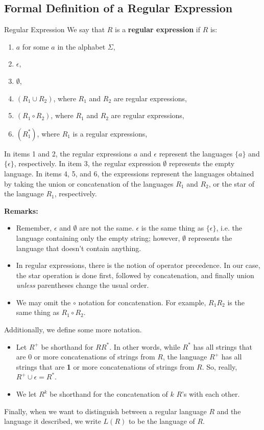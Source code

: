 \documentclass[letterpaper]{article}
\begin{document}
\subsection{Formal Definition of a Regular Expression}
\begin{definition}{Regular Expression}{}
    We say that $R$ is a \textbf{regular expression} if $R$ is: 
    \begin{enumerate}
        \item $a$ for some $a$ in the alphabet $\Sigma$,
        \item $\epsilon$,
        \item $\emptyset$,
        \item $(R_1 \cup R_2)$, where $R_1$ and $R_2$ are regular expressions,
        \item $(R_1 \circ R_2)$, where $R_1$ and $R_2$ are regular expressions,
        \item $(R_1^*)$, where $R_1$ is a regular expressions,
    \end{enumerate}
    In items 1 and 2, the regular expressions $a$ and $\epsilon$ represent the languages $\{a\}$ and $\{\epsilon\}$, respectively. In item 3, the regular expression $\emptyset$ represents the empty language. In items 4, 5, and 6, the expressions represent the languages obtained by taking the union or concatenation of the languages $R_1$ and $R_2$, or the star of the language $R_1$, respectively. 
\end{definition}
\textbf{Remarks:}
\begin{itemize}
    \item Remember, $\epsilon$ and $\emptyset$ are not the same. $\epsilon$ is the same thing as $\{\epsilon\}$, i.e. the language containing only the empty string; however, $\emptyset$ represents the language that doesn't contain anything. 
    \item In regular expressions, there is the notion of operator precedence. In our case, the star operation is done first, followed by concatenation, and finally union \emph{unless} parentheses change the usual order.
    \item We may omit the $\circ$ notation for concatenation. For example, $R_1 R_2$ is the same thing as $R_1 \circ R_2$.  
\end{itemize}
Additionally, we define some more notation.
\begin{itemize}
    \item Let $R^+$ be shorthand for $RR^*$. In other words, while $R^*$ has all strings that are 0 or more concatenations of strings from $R$, the language $R^+$ has all strings that are \textbf{1} or more concatenations of strings from $R$. So, really, $R^+ \cup \epsilon = R^*$. 
    \item We let $R^k$ be shorthand for the concatenation of $k$ $R$'s with each other. 
\end{itemize}
Finally, when we want to distinguish between a regular language $R$ and the language it described, we write $L(R)$ to be the language of $R$. 
\end{document}
